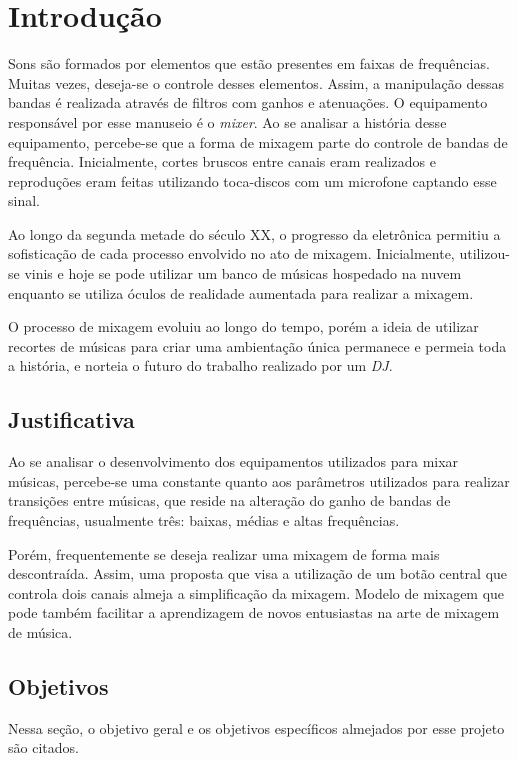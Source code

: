 \chapter[Introdução]{Introdução}

Sons são formados por elementos que estão presentes em faixas de frequências. Muitas vezes, deseja-se o controle desses elementos. Assim, a manipulação dessas bandas é realizada através de filtros com ganhos e atenuações. O equipamento responsável por esse manuseio é o \textit{mixer}.
Ao se analisar a história desse equipamento, percebe-se que a forma de mixagem parte do controle de bandas de frequência. Inicialmente, cortes bruscos entre canais eram realizados e reproduções eram feitas utilizando toca-discos com um microfone captando esse sinal.

Ao longo da segunda metade do século XX, o progresso da eletrônica permitiu a sofisticação de cada processo envolvido no ato de mixagem. Inicialmente, utilizou-se vinis e hoje se pode utilizar um banco de músicas hospedado na nuvem enquanto se utiliza óculos de realidade aumentada para realizar a mixagem.

O processo de mixagem evoluiu ao longo do tempo, porém a ideia de utilizar recortes de músicas para criar uma ambientação única permanece e permeia toda a história, e norteia o futuro do trabalho realizado por um \textit{DJ}.

\section{Justificativa}
Ao se analisar o desenvolvimento dos equipamentos utilizados para mixar músicas, percebe-se uma constante quanto aos parâmetros utilizados para realizar transições entre músicas, que reside na alteração do ganho de bandas de frequências, usualmente três: baixas, médias e altas frequências.

Porém, frequentemente se deseja realizar uma mixagem de forma mais descontraída. Assim, uma proposta que visa a utilização de um botão central que controla dois canais almeja a simplificação da mixagem. Modelo de mixagem que pode também facilitar a aprendizagem de novos entusiastas na arte de mixagem de música.

\section{Objetivos}

Nessa seção, o objetivo geral e os objetivos específicos almejados por esse projeto são citados.

